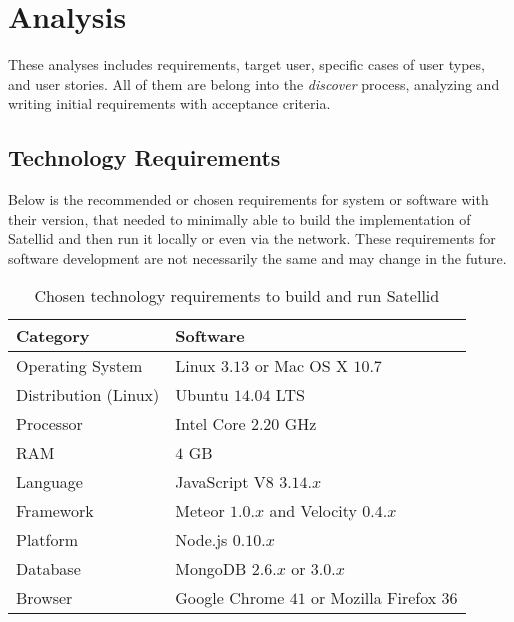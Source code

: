\section{Analysis}
\label{sec:analysis}

These analyses includes requirements, target user, specific cases of user types, and user stories.
All of them are belong into the \textit{discover} process, analyzing and writing initial requirements with acceptance criteria.

\subsection{Technology Requirements}

Below is the recommended or chosen requirements for system or software with their version, that needed to minimally able to build the implementation of Satellid and then run it locally or even via the network.
These requirements for software development are not necessarily the same and may change in the future.

\begin{table}[!h]
\centering
\begin{tabular}{ |l||l| }
\hline
Category & Software  \\ \hline
\hline
Operating System      &  Linux $3.13$ or Mac OS X $10.7$  \\ \hline
Distribution (Linux)  &  Ubuntu $14.04$ LTS  \\ \hline
Processor  &  Intel Core $2.20$ GHz   \\ \hline
RAM        &  $4$ GB                  \\ \hline
Language   &  JavaScript V8 $3.14.x$  \\ \hline
Framework  &  Meteor $1.0.x$ and Velocity $0.4.x$  \\ \hline
Platform   &  Node.js $0.10.x$            \\ \hline
Database   &  MongoDB $2.6.x$ or $3.0.x$  \\ \hline
Browser    &  Google Chrome $41$ or Mozilla Firefox $36$ \\ \hline
\end{tabular}
\caption[Chosen technology requirements]{Chosen technology requirements to build and run Satellid}
\label{table:tech-requirements}
\end{table}

